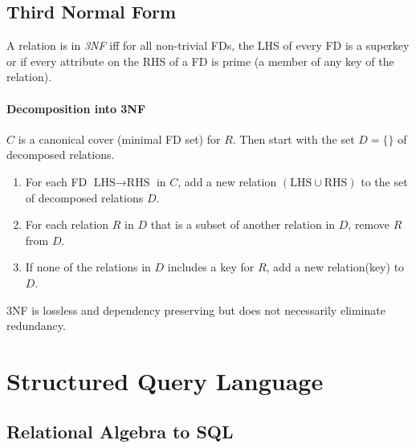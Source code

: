 \documentclass[twocolumn,english]{article}
\begin{document}
\subsection{Third Normal Form}

A relation is in \emph{3NF} iff for all non-trivial FDs, the LHS of
every FD is a superkey or if every attribute on the RHS of a FD is
prime (a member of any key of the relation).


\paragraph{Decomposition into 3NF}

$C$ is a canonical cover (minimal FD set) for $R$. Then start with
the set $D=\{\}$ of decomposed relations.
\begin{enumerate}
\item For each FD $\mbox{LHS}\rightarrow\mbox{RHS}$ in $C$, add a new
relation $\left(\mbox{LHS}\cup\mbox{RHS}\right)$ to the set of decomposed
relations $D$.
\item For each relation $R$ in $D$ that is a subset of another relation
in $D$, remove $R$ from $D$.
\item If none of the relations in $D$ includes a key for $R$, add a new
relation(key) to $D$.
\end{enumerate}
3NF is lossless and dependency preserving but does not necessarily
eliminate redundancy.


\section{Structured Query Language}


\subsection{Relational Algebra to SQL}
\end{document}
